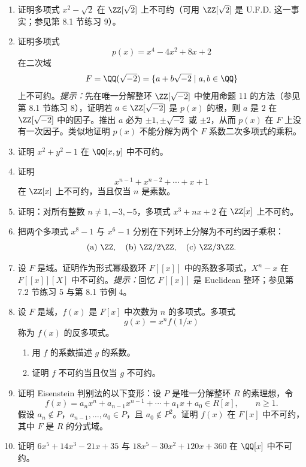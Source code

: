 \begin{enumerate}[label=\arabic*.]
	\item 证明多项式 $x^2-\sqrt2$ 在 $\ZZ[\sqrt2]$ 上不可约（可用 $\ZZ[\sqrt2]$ 是 U.F.D. 这一事实；参见第 8.1 节练习 9）。
	
	\item 证明多项式
	\[
	p(x)=x^4-4x^2+8x+2
	\]
	在二次域
	\[
	F=\QQ(\sqrt{-2})=\{a+b\sqrt{-2}\mid a,b\in\QQ\}
	\]
	上不可约。\emph{提示：}先在唯一分解整环 $\ZZ[\sqrt{-2}]$ 中使用命题 11 的方法（参见第 8.1 节练习 8），证明若 $a\in\ZZ[\sqrt{-2}]$ 是 $p(x)$ 的根，则 $a$ 是 $2$ 在 $\ZZ[\sqrt{-2}]$ 中的因子。推出 $a$ 必为 $\pm1,\pm\sqrt{-2}$ 或 $\pm2$，从而 $p(x)$ 在 $F$ 上没有一次因子。类似地证明 $p(x)$ 不能分解为两个 $F$ 系数二次多项式的乘积。
	
	\item 证明 $x^2+y^2-1$ 在 $\QQ[x,y]$ 中不可约。
	
	\item 证明
	\[
	x^{n-1}+x^{n-2}+\cdots+x+1
	\]
	在 $\ZZ[x]$ 上不可约，当且仅当 $n$ 是素数。
	
	\item 证明：对所有整数 $n\neq1,-3,-5$，多项式 $x^3+nx+2$ 在 $\ZZ[x]$ 上不可约。
	
	\item 把两个多项式 $x^8-1$ 与 $x^6-1$ 分别在下列环上分解为不可约因子乘积：
	\[
	\text{(a) }\ZZ,
	\quad \text{(b) }\ZZ/2\ZZ,
	\quad \text{(c) }\ZZ/3\ZZ.
	\]
	
	\item 设 $F$ 是域。证明作为形式幂级数环 $F[[x]]$ 中的系数多项式，$X^n-x$ 在 $F[[x]][X]$ 中不可约。\emph{提示：}回忆 $F[[x]]$ 是 Euclidean 整环；参见第 7.2 节练习 5 与第 8.1 节例 4。
	
	\item 设 $F$ 是域，$f(x)$ 是 $F[x]$ 中次数为 $n$ 的多项式。多项式
	\[
	g(x)=x^n f(1/x)
	\]
	称为 $f(x)$ 的反多项式。
	\begin{enumerate}[label=(\alph*)]
		\item 用 $f$ 的系数描述 $g$ 的系数。
		\item 证明 $f$ 不可约当且仅当 $g$ 不可约。
	\end{enumerate}
	
	\item 证明 Eisenstein 判别法的以下变形：设 $P$ 是唯一分解整环 $R$ 的素理想，令
	\[
	f(x)=a_nx^n+a_{n-1}x^{n-1}+\cdots+a_1x+a_0\in R[x],\qquad n\geq1.
	\]
	假设 $a_n\notin P$，$a_{n-1},\ldots,a_0\in P$，且 $a_0\notin P^2$。证明 $f(x)$ 在 $F[x]$ 中不可约，其中 $F$ 是 $R$ 的分式域。
	
	\item 证明 $6x^5+14x^3-21x+35$ 与 $18x^5-30x^2+120x+360$ 在 $\QQ[x]$ 中不可约。
	

\end{enumerate}
